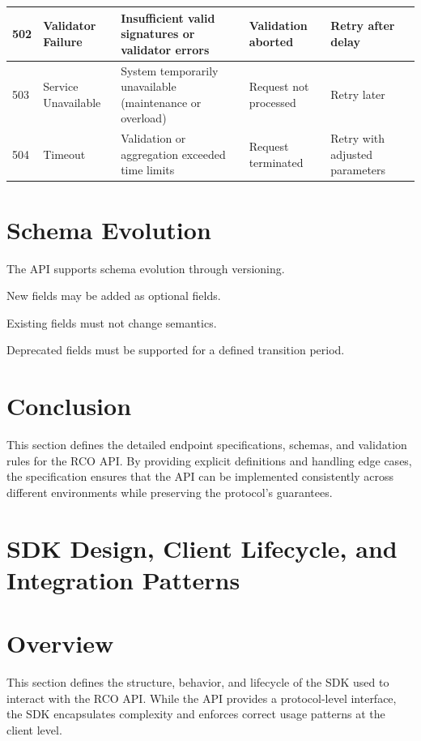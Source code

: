 \begin{table}[htbp]
\begin{tabularx}{\textwidth}{|p{2cm}|p{3cm}|X|X|X|}
502 & Validator Failure & Insufficient valid signatures or validator errors & Validation aborted & Retry after delay \\

\hline

503 & Service Unavailable & System temporarily unavailable (maintenance or overload) & Request not processed & Retry later \\

\hline

504 & Timeout & Validation or aggregation exceeded time limits & Request terminated & Retry with adjusted parameters \\

\hline

\end{tabularx}
\end{table}

\section{Schema Evolution}

The API supports schema evolution through versioning.

New fields may be added as optional fields.

Existing fields must not change semantics.

Deprecated fields must be supported for a defined transition period.

\section{Conclusion}

This section defines the detailed endpoint specifications, schemas, and validation rules for the RCO API. By providing explicit definitions and handling edge cases, the specification ensures that the API can be implemented consistently across different environments while preserving the protocol’s guarantees.

\section{SDK Design, Client Lifecycle, and Integration Patterns}

\section{Overview}

This section defines the structure, behavior, and lifecycle of the SDK used to interact with the RCO API. While the API provides a protocol-level interface, the SDK encapsulates complexity and enforces correct usage patterns at the client level.

